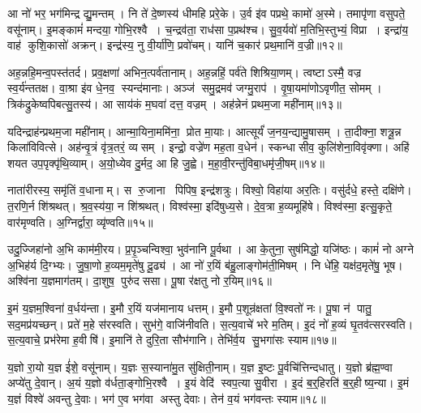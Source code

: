 आ नो॑ भर॒ भग॑मिन्द्र द्यु॒मन्तम्।
नि ते॑ दे॒ष्णस्य॑ धीमहि प्ररे॒के।
उ॒र्व इ॑व पप्रथे॒ कामो॑ अ॒स्मे।
तमापृ॑णा वसुपते॒ वसू॑नाम्।
इ॒मङ्कामं॑ मन्दया॒ गोभि॒रश्वै।
च॒न्द्रव॑ता॒ राध॑सा प॒प्रथ॑श्च।
सु॒व॒र्यवो॑ म॒तिभि॒स्तुभ्यं॒ विप्रा।
इन्द्रा॑य॒ वाह॑ कुशि॒कासो॑ अक्रन्।
इन्द्र॑स्य॒ नु वी॒र्या॑णि॒ प्रवो॑चम्।
यानि॑ च॒कार॑ प्रथ॒मानि॑ व॒ज्री॥१२॥

अह॒न्नहि॒मन्व॒पस्त॑तर्द।
प्रव॒क्षणा॑ अभिन॒त्पर्व॑तानाम्।
अह॒न्नहिं॒ पर्व॑ते शिश्रिया॒णम्।
त्वष्टाऽस्मै॒ वज्र स्व॒र्य॑न्ततक्ष।
वा॒श्रा इ॑व धे॒नव॒ स्यन्द॑मानाः।
अञ्ज॑ समु॒द्रमव॑ जग्मु॒राप॑।
वृ॒षा॒यमा॑णोऽवृणीत॒ सोमम्।
त्रिक॑द्रुकेष्वपिबत्सु॒तस्य॑।
आ साय॑कं म॒घवा॑ दत्त॒ वज्रम्।
अह॑न्नेनं प्रथम॒जा मही॑नाम्॥१३॥

यदिन्द्राह॑न्प्रथम॒जा मही॑नाम्।
आन्मा॒यिना॒ममि॑ना॒ प्रोत मा॒याः।
आत्सूर्यं॑ ज॒नय॒न्द्यामु॒षासम्।
ता॒दीक्ना॒ शत्रू॒न्न किला॑विवित्से।
अह॑न्वृ॒त्रं वृ॑त्र॒तरं॒ व्यसम्।
इन्द्रो॒ वज्रे॑ण मह॒ता व॒धेन॑।
स्कन्धासीव॒ कुलि॑शेना॒विवृ॑क्णा।
अहि॑ शयत उप॒पृक्पृ॑थि॒व्याम्।
अ॒यो॒ध्येव दु॒र्मद॒ आ हि जु॒ह्वे।
म॒हा॒वी॒रन्तु॑विबा॒धमृ॑जी॒षम्॥१४॥

नाता॑रीरस्य॒ समृ॑तिं व॒धानाम्।
स रु॒जाना पिपिष॒ इन्द्र॑शत्रुः।
विश्वो॒ विहा॑या अर॒तिः।
वसु॑र्दधे॒ हस्ते॒ दक्षि॑णे।
त॒रणि॒र्न शि॑श्रथत्।
श्र॒व॒स्य॑या॒ न शि॑श्रथत्।
विश्व॑स्मा॒ इदि॑षुध्य॒से।
दे॒व॒त्रा ह॒व्यमूहि॑षे।
विश्व॑स्मा॒ इत्सु॒कृते॒ वार॑मृण्वति।
अ॒ग्निर्द्वारा॒ व्यृ॑ण्वति॥१५॥

उदु॒ज्जिहा॑नो अ॒भि काम॑मी॒रय\sn{}।
प्र॒पृ॒ञ्चन्विश्वा॒ भुव॑नानि पू॒र्वथा।
आ के॒तुना॒ सुष॑मिद्धो॒ यजि॑ष्ठः।
कामं॑ नो अग्ने अ॒भिह॑र्य दि॒ग्भ्यः।
जु॒षा॒णो ह॒व्यम॒मृते॑षु दू॒ढ्य॑।
आ नो॑ र॒यिं ब॑हु॒लाङ्गोम॑ती॒मिषम्।
नि धे॑हि॒ यक्ष॑द॒मृते॑षु॒ भूष\sn{}।
अश्वि॑ना य॒ज्ञमाग॑तम्।
दा॒शुष॒ पुरु॑दससा।
पू॒षा र॑क्षतु नो र॒यिम्॥१६॥

इ॒मं य॒ज्ञम॒श्विना॑ व॒र्धय॑न्ता।
इ॒मौ र॒यिं यज॑मानाय धत्तम्।
इ॒मौ प॒शून्र॑क्षतां वि॒श्वतो॑ नः।
पू॒षा न॑ पातु॒ सद॒मप्र॑यच्छन्।
प्रते॑ म॒हे स॑रस्वति।
सुभ॑गे॒ वाजि॑नीवति।
स॒त्य॒वाचे॑ भरे म॒तिम्।
इ॒दं नो॑ ह॒व्यं घृ॒तव॑त्सरस्वति।
स॒त्य॒वाचे॒ प्रभ॑रेमा ह॒वीषि॑।
इ॒मानि॑ ते दुरि॒ता सौभ॑गानि।
तेभि॑र्व॒य सु॒भगा॑सः स्याम॥१७॥\anuvakamend[व॒ज्र्यही॑नामृजी॒षं व्यृ॑ण्वति रक्षतु नो र॒यि सौभ॑गा॒न्येकं च]

य॒ज्ञो रा॒यो य॒ज्ञ ई॑शे॒ वसू॑नाम्।
य॒ज्ञः स॒स्याना॑मु॒त सु॑क्षिती॒नाम्।
य॒ज्ञ इ॒ष्टः पू॒र्वचि॑त्तिन्दधातु।
य॒ज्ञो ब्र॑ह्म॒ण्वा अप्ये॑तु दे॒वान्।
अ॒यं य॒ज्ञो व॑र्धता॒ङ्गोभि॒रश्वै।
इ॒यं वेदि॑ स्वप॒त्या सु॒वीरा।
इ॒दं ब॒र्॒हिरति॑ ब॒र्॒हीष्य॒न्या।
इ॒मं य॒ज्ञं विश्वे॑ अवन्तु दे॒वाः।
भग॑ ए॒व भग॑वा अस्तु देवाः।
तेन॑ व॒यं भग॑वन्तः स्याम॥१८॥

